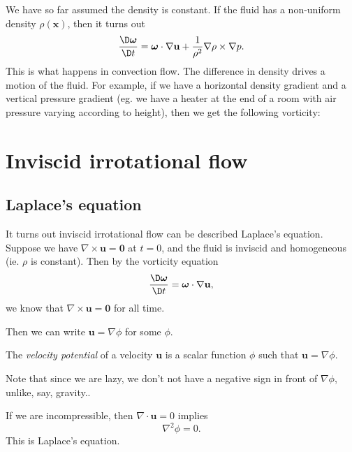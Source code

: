 \documentclass[a4paper]{article}
\begin{document}
We have so far assumed the density is constant. If the fluid has a non-uniform density $\rho(\mathbf{x})$, then it turns out
\[
  \frac{\D \boldsymbol\omega}{\D t} = \boldsymbol\omega \cdot \nabla \mathbf{u} + \frac{1}{\rho^2} \nabla \rho \times \nabla p.
\]
This is what happens in convection flow. The difference in density drives a motion of the fluid. For example, if we have a horizontal density gradient and a vertical pressure gradient (eg. we have a heater at the end of a room with air pressure varying according to height), then we get the following vorticity:
\begin{center}
\end{center}

\section{Inviscid irrotational flow}

\subsection{Laplace's equation}
It turns out inviscid irrotational flow can be described Laplace's equation. Suppose we have $\nabla \times \mathbf{u} = \mathbf{0}$ at $t = 0$, and the fluid is inviscid and homogeneous (ie. $\rho$ is constant). Then by the vorticity equation
\[
  \frac{\D \boldsymbol\omega}{\D t} = \boldsymbol\omega \cdot \nabla \mathbf{u},
\]
we know that $\nabla \times \mathbf{u} = \mathbf{0}$ for all time.

Then we can write $\mathbf{u} = \nabla \phi$ for some $\phi$.
\begin{defi}
  The \emph{velocity potential} of a velocity $\mathbf{u}$ is a scalar function $\phi$ such that $\mathbf{u} = \nabla \phi$.
\end{defi}
Note that since we are lazy, we don't not have a negative sign in front of $\nabla \phi$, unlike, say, gravity..

If we are incompressible, then $\nabla \cdot \mathbf{u} = 0$ implies
\[
  \nabla^2 \phi = 0.
\]
This is Laplace's equation.
\end{document}
